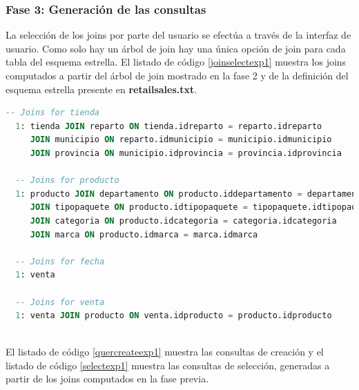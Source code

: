 \subsubsection{Fase 3: Generaci\'on de las consultas}

La selecci\'on de los joins por parte del usuario se efectúa a través de la interfaz de usuario. 
Como solo hay un \'arbol de join hay una \'unica opción de join para 
cada tabla del esquema estrella. El listado de c\'odigo \ref{joinselectexp1} muestra los joins 
computados a partir del \'arbol de join mostrado en la fase 2 y de la definición del esquema estrella 
presente en \textbf{retailsales.txt}.

\begin{lstlisting}[label={joinselectexp1}, caption={Joins computados para el experimento 1}, language={sql}]
  -- Joins for tienda
  1: tienda JOIN reparto ON tienda.idreparto = reparto.idreparto 
     JOIN municipio ON reparto.idmunicipio = municipio.idmunicipio 
     JOIN provincia ON municipio.idprovincia = provincia.idprovincia

  -- Joins for producto
  1: producto JOIN departamento ON producto.iddepartamento = departamento.iddepartamento 
     JOIN tipopaquete ON producto.idtipopaquete = tipopaquete.idtipopaquete 
     JOIN categoria ON producto.idcategoria = categoria.idcategoria 
     JOIN marca ON producto.idmarca = marca.idmarca

  -- Joins for fecha
  1: venta

  -- Joins for venta
  1: venta JOIN producto ON venta.idproducto = producto.idproducto
  
\end{lstlisting}

El listado de c\'odigo \ref{quercreateexp1} muestra las consultas de creaci\'on y el listado de c\'odigo 
\ref{selectexp1} muestra las consultas de selecci\'on, generadas a partir de los joins computados en 
la fase previa.


